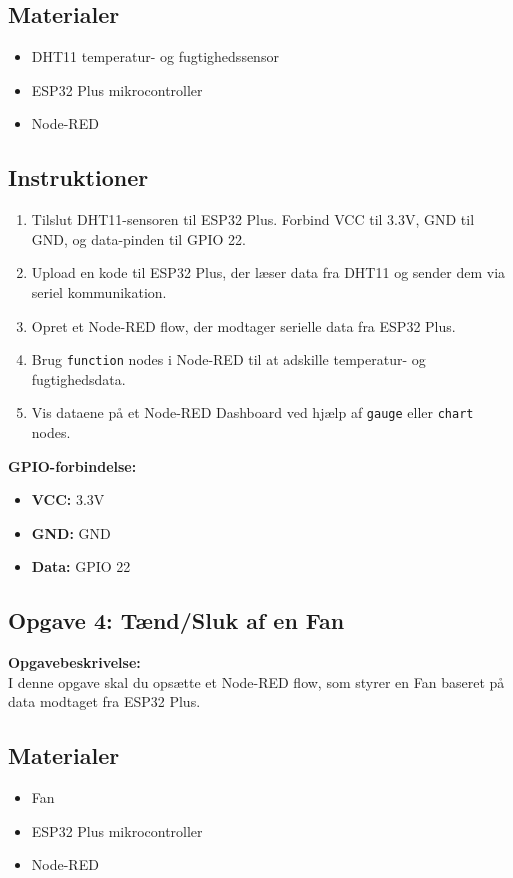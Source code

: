 \subsection{Materialer}
\begin{itemize}
	\item DHT11 temperatur- og fugtighedssensor
	\item ESP32 Plus mikrocontroller
	\item Node-RED
\end{itemize}

\subsection{Instruktioner}
\begin{enumerate}
	\item Tilslut DHT11-sensoren til ESP32 Plus. Forbind VCC til 3.3V, GND til GND, og data-pinden til GPIO 22.
	\item Upload en kode til ESP32 Plus, der læser data fra DHT11 og sender dem via seriel kommunikation.
	\item Opret et Node-RED flow, der modtager serielle data fra ESP32 Plus.
	\item Brug \texttt{function} nodes i Node-RED til at adskille temperatur- og fugtighedsdata.
	\item Vis dataene på et Node-RED Dashboard ved hjælp af \texttt{gauge} eller \texttt{chart} nodes.
\end{enumerate}

\noindent\textbf{GPIO-forbindelse:}
\begin{itemize}
	\item \textbf{VCC:} 3.3V
	\item \textbf{GND:} GND
	\item \textbf{Data:} GPIO 22
\end{itemize}

\subsection{Opgave 4: Tænd/Sluk af en Fan}
\textbf{Opgavebeskrivelse:} \\
I denne opgave skal du opsætte et Node-RED flow, som styrer en Fan baseret på data modtaget fra ESP32 Plus.

\subsection{Materialer}
\begin{itemize}
	\item Fan
	\item ESP32 Plus mikrocontroller
	\item Node-RED
\end{itemize}

